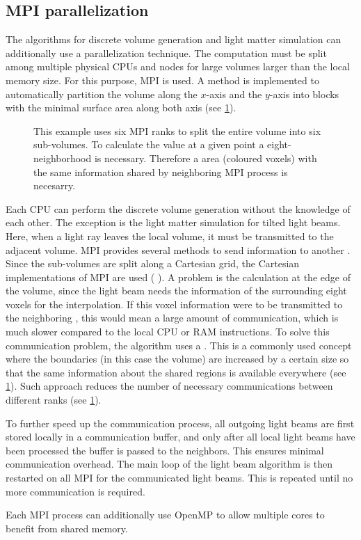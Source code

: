 \subsection{MPI parallelization}\label{sec:mpiSim}
%
The algorithms for discrete volume generation and light matter simulation can additionally use a parallelization technique.
The computation must be split among multiple physical \acp{CPU} and nodes for large volumes larger than the local memory size.
For this purpose,  \ac{MPI} is used.
A method is implemented to automatically partition the volume along the $x$-axis and the $y$-axis into blocks with the minimal surface area along both axis (see \cref{fig:com_halo}).
\par
%
\begin{figure}[!t]
    \centering
    \setlength{\tikzwidth}{0.85\textwidth}
    \caption{ This example uses six \ac{MPI} ranks to split the entire volume into six sub-volumes. To calculate the value at a given point a eight-neighborhood is necessary. Therefore a  area (coloured voxels) with the same information shared by neighboring \ac{MPI} process is necesarry.}
    \label{fig:com_halo}
\end{figure}
% 
Each \ac{CPU} can perform the discrete volume generation without the knowledge of each other.
The exception is the light matter simulation for tilted light beams.
Here, when a light ray leaves the local volume, it must be transmitted to the adjacent volume.
\ac{MPI} provides several methods to send information to another .
Since the sub-volumes are split along a Cartesian grid, the Cartesian implementations of \ac{MPI} are used (\eg{} ).
A problem is the calculation at the edge of the volume, since the light beam needs the information of the surrounding eight voxels for the interpolation.
If this voxel information were to be transmitted to the neighboring , this would mean a large amount of communication, which is much slower compared to the local \ac{CPU} or \ac{RAM} instructions.
To solve this communication problem, the algorithm uses a .
This is a commonly used concept where the boundaries (in this case the volume) are increased by a certain size so that the same information about the shared regions is available everywhere (see \cref{fig:com_halo}).
Such approach reduces the number of necessary communications between different ranks (see \cref{fig:com_halo}).
\par
% 
To further speed up the communication process, all outgoing light beams are first stored locally in a communication buffer, and only after all local light beams have been processed the buffer is passed to the neighbors.
This ensures minimal communication overhead.
The main loop of the light beam algorithm is then restarted on all \ac{MPI}  for the communicated light beams.
This is repeated until no more communication is required.
\par
%
Each \ac{MPI} process can additionally use \ac{OpenMP} to allow multiple cores to benefit from shared memory.
